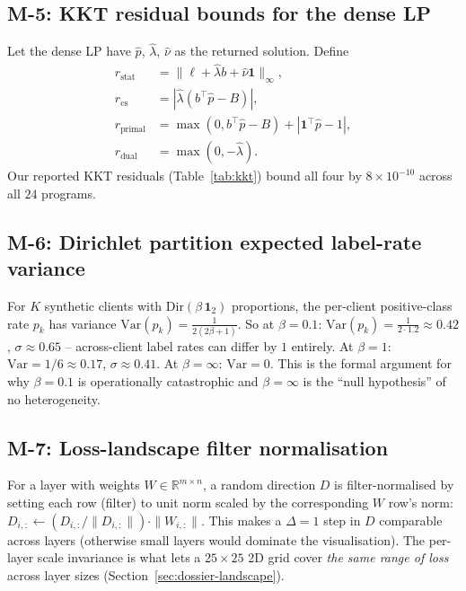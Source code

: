 \subsection{M-5: KKT residual bounds for the dense LP}

Let the dense LP have $\hat p$, $\hat\lambda$, $\hat\nu$ as the
returned solution. Define
\begin{align*}
r_{\mathrm{stat}}  &= \|\ell + \hat\lambda b + \hat\nu \mathbf{1}\|_\infty,\\
r_{\mathrm{cs}}    &= |\hat\lambda(b^\top \hat p - B)|,\\
r_{\mathrm{primal}}&= \max(0, b^\top \hat p - B) + |\mathbf{1}^\top \hat p - 1|,\\
r_{\mathrm{dual}}  &= \max(0, -\hat\lambda).
\end{align*}
Our reported KKT residuals (Table~\ref{tab:kkt}) bound all four by
$8 \!\times\! 10^{-10}$ across all $24$ programs.

\subsection{M-6: Dirichlet partition expected label-rate variance}

For $K$ synthetic clients with $\mathrm{Dir}(\beta\,\mathbf{1}_2)$
proportions, the per-client positive-class rate $p_k$ has variance
$\mathrm{Var}(p_k) = \frac{1}{2(2\beta + 1)}$. So at
$\beta = 0.1$: $\mathrm{Var}(p_k) = \frac{1}{2 \cdot 1.2} \approx 0.42$,
$\sigma \approx 0.65$ -- across-client label rates can differ by
$1$ entirely. At $\beta = 1$: $\mathrm{Var} = 1/6 \approx 0.17$,
$\sigma \approx 0.41$. At $\beta = \infty$: $\mathrm{Var} = 0$.
This is the formal argument for why $\beta = 0.1$ is operationally
catastrophic and $\beta = \infty$ is the ``null hypothesis'' of no
heterogeneity.

\subsection{M-7: Loss-landscape filter normalisation}

For a layer with weights $W \in \mathbb{R}^{m \times n}$, a
random direction $D$ is filter-normalised by setting each row
(filter) to unit norm scaled by the corresponding $W$ row's norm:
$D_{i,:} \!\leftarrow\! (D_{i,:}/\|D_{i,:}\|) \cdot \|W_{i,:}\|$.
This makes a $\Delta\!=\!1$ step in $D$ comparable across layers
(otherwise small layers would dominate the visualisation). The
per-layer scale invariance is what lets a $25 \times 25$ 2D grid
cover \emph{the same range of loss} across layer sizes
(Section~\ref{sec:dossier-landscape}).

